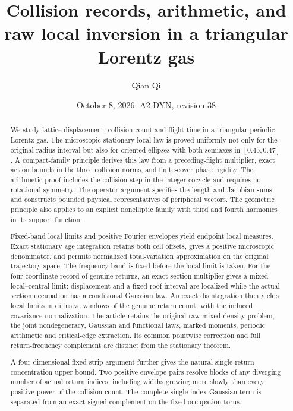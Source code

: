 \documentclass[11pt,reqno]{amsart}
\title[Collision records and raw local inversion]{Collision records, arithmetic, and raw local inversion in a triangular Lorentz gas}
\author{Qian Qi}
\date{October 8, 2026. A2-DYN, revision 38}
\numberwithin{equation}{section}
\theoremstyle{definition}\newtheorem{definition}[theorem]{Definition}
\theoremstyle{remark}\newtheorem{remark}[theorem]{Remark}
\begin{document}
\raggedbottom
\begin{abstract}
We study lattice displacement, collision count and flight time in a
triangular periodic Lorentz gas. The microscopic stationary local law
is proved uniformly not only for the original radius interval but also
for oriented ellipses with both semiaxes in $[0.45,0.47]$. A compact-family
principle derives this law from a preceding-flight multiplier, exact
action bounds in the three collision norms, and finite-cover phase
rigidity. The arithmetic proof includes the collision step in the
integer cocycle and requires no rotational symmetry. The operator
argument specifies the length and Jacobian sums and constructs bounded
physical representatives of peripheral vectors. The geometric principle
also applies to an explicit nonelliptic family with third and fourth
harmonics in its support function.

Fixed-band local limits and positive Fourier envelopes yield endpoint
local measures. Exact stationary age integration retains both cell
offsets, gives a positive microscopic denominator, and permits
normalized total-variation approximation on the original trajectory
space. The frequency band is fixed before the local limit is taken.
For the four-coordinate record of genuine returns, an exact section
multiplier gives a mixed local--central limit: displacement and a
fixed roof interval are localized while the actual section occupation
has a conditional Gaussian law. An exact disintegration then yields
local limits in diffusive windows of the genuine return count, with
the induced covariance normalization. The article retains the original
raw mixed-density problem, the joint nondegeneracy,
Gaussian and functional laws, marked moments, periodic arithmetic and
critical-edge extraction. Its common pointwise correction and full
return-frequency complement are distinct from the stationary theorem.

A four-dimensional fixed-strip argument further gives the natural
single-return concentration upper bound. Two positive envelope pairs
resolve blocks of any diverging number of actual return indices,
including widths growing more slowly than every positive power of the
collision count. The complete single-index Gaussian term is separated
from an exact signed complement on the fixed occupation torus.
\end{abstract}
\maketitle
\enlargethispage{3pt}
\end{document}
